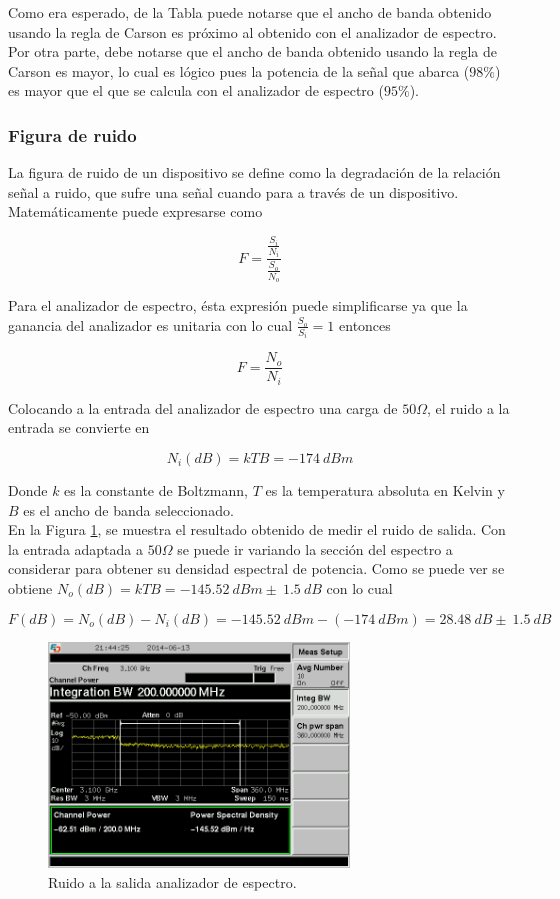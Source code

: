 \documentclass[a4paper,10pt]{article}
\begin{document}
		\indent Como era  esperado, de la Tabla puede notarse  que el ancho de 
		banda obtenido usando la regla de Carson es pr\'oximo al obtenido con el
		analizador de espectro. Por otra parte, debe notarse que el ancho de 
		banda obtenido usando la regla de Carson es mayor, lo cual es l\'ogico 
		pues la potencia de la se\~nal que abarca ($98\%$) es mayor que el que 
		se calcula con el analizador de espectro ($95\%$).
		
		\subsubsection{Figura de ruido}
		\indent La figura de ruido de un dispositivo se define como la 
		degradaci\'on de la relaci\'on se\~nal a ruido, que sufre una se\~nal 
		cuando para a trav\'es de un dispositivo. Matem\'aticamente puede 
		expresarse como 
		
		$$F=\frac{\frac{S_i}{N_i}}{\frac{S_o}{N_o}}$$
		
		\indent Para el analizador de espectro, \'esta expresi\'on puede 
		simplificarse ya que la ganancia del analizador es unitaria con lo cual 
		$\frac{S_o}{S_i}=1$ entonces
		
		$$F=\frac{N_o}{N_i}$$
		
		\indent Colocando a la entrada del analizador de espectro una carga de 
		$50\Omega$, el ruido a la entrada se convierte en 

		$$N_i(dB)=kTB=-174~dBm$$
		
		\indent Donde $k$ es la constante de Boltzmann, $T$ es la temperatura 
		absoluta en Kelvin y $B$ es el ancho de banda seleccionado. \\
		\indent En la Figura \ref{noise}, se muestra el resultado obtenido de 
		medir el ruido de salida. Con la entrada adaptada a $50\Omega$ se puede 
		ir variando la secci\'on del espectro a considerar para obtener su 
		densidad espectral de potencia. Como se puede ver se obtiene 
		$N_o(dB)=kTB=-145.52~dBm\pm~1.5~dB$ con lo cual
		
		$$F(dB)=N_o(dB)-N_i(dB)=-145.52~dBm-(-174~dBm)=28.48~dB\pm~1.5~dB$$
		
		\begin{figure}[!htb]
				\centering
				\includegraphics[width=8cm]
				{Imagenes/SCREN464.png}
				\caption{Ruido a la salida  analizador de espectro.}
				\label{noise} 
		\end{figure}
		
\end{document}
